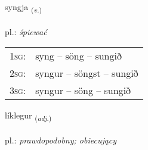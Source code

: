\documentclass[frontgrid, backgrid]{flacards}\usepackage[]{graphicx}\usepackage[]{xcolor}
\begin{document}
\renewcommand{\flhead}{\vskip5pt \fboxsep=0pt {\small\bfseries\footnotesize Sagnorð | czasownik}}
\renewcommand{\fcfoot}{\vskip5pt \fboxsep=0pt \hspace{2pt}{\small\bfseries\footnotesize 1K}}

\renewcommand{\blhead}{\vskip5pt {\small\bfseries\footnotesize Sagnorð | czasownik }}
\renewcommand{\bcfoot}{\vskip5pt \hspace{2pt}{\small\bfseries\footnotesize 1K}}


{syngja \small{\textsubscript{(\textit{v.})}} \\[1ex] %
\textphonetic{[siɲca]} \\
pl.: \emph{śpiewać} \\  [2ex]
\renewcommand*{\arraystretch}{0.8}
\begin{tabular}{p{1cm}l}
\textsc{1sg}: & syng -- söng -- sungið \\ 
\textsc{2sg}: & syngur -- söngst -- sungið \\ 
\textsc{3sg}: & syngur -- söng -- sungið \\ 
\end{tabular}
}

\renewcommand{\flhead}{\vskip5pt \fboxsep=0pt {\small\bfseries\footnotesize Lýsingarorð | przymiotnik}}
\renewcommand{\fcfoot}{\vskip5pt \fboxsep=0pt \hspace{2pt}{\small\bfseries\footnotesize 1K}}

\renewcommand{\blhead}{\vskip5pt {\small\bfseries\footnotesize Lýsingarorð | przymiotnik }}
\renewcommand{\bcfoot}{\vskip5pt \hspace{2pt}{\small\bfseries\footnotesize 1K}}


{líklegur \small{\textsubscript{(\textit{adj.})}} \\[1ex] %
\textphonetic{[lihklɛɣʏr]} \\
pl.: \emph{prawdopodobny; obiecujący} \\  [2ex]
\renewcommand*{\arraystretch}{0.8}
}
\end{document}
